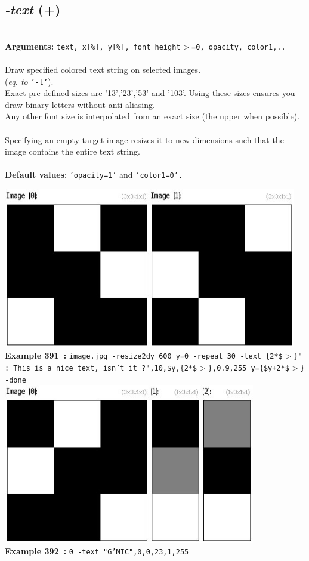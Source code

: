 \documentclass[a4paper,11pt,twoside]{book}
\begin{document}
\subsection{\emph{-text} (+)}\vspace*{-0.5em}
~\\\textbf{Arguments: } 
{\small \texttt{text,\_x[\%],\_y[\%],\_font\_height$>$=0,\_opacity,\_color1,..}}\\~\\
Draw specified colored text string on selected images.
~\\(\emph{eq. to} {\small \texttt{'-t'}}).
~\\Exact pre-defined sizes are '13','23','53' and '103'. Using these sizes ensures you draw binary letters without anti-aliasing.
~\\Any other font size is interpolated from an exact size (the upper when possible).
~\\Specifying an empty target image resizes it to new dimensions such that the image contains
the entire text string.
~\\~\\\textbf{Default values}: {\small \texttt{'opacity=1'} and \texttt{'color1=0'.}}
\begin{center}\includegraphics[keepaspectratio=true,height=7cm,width=\textwidth]{img/gmic_def391.jpg}\\
{\footnotesize \textbf{Example 391~:} \texttt{image.jpg -resize2dy 600 y=0 -repeat 30 -text \{2*\$$>$\}" : This is a nice text, isn't it ?",10,\$y,\{2*\$$>$\},0.9,255 y=\{\$y+2*\$$>$\} -done}}
\\\includegraphics[keepaspectratio=true,height=7cm,width=\textwidth]{img/gmic_def392.jpg}\\
{\footnotesize \textbf{Example 392~:} \texttt{0 -text "G'MIC",0,0,23,1,255}}
\end{center}
\end{document}
